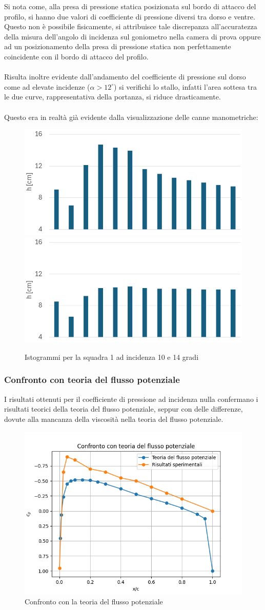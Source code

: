\noindent Si nota come, alla presa di pressione statica posizionata sul bordo di attacco del profilo, si hanno due valori di coefficiente di pressione diversi tra dorso e ventre. Questo non è possibile fisicamente, si attribuisce tale discrepanza all'accuratezza della misura dell'angolo di incidenza sul goniometro nella camera di prova oppure ad un posizionamento della presa di pressione statica non perfettamente coincidente con il bordo di attacco del profilo.\\\\
Risulta inoltre evidente dall'andamento del coefficiente di pressione sul dorso come ad elevate incidenze ($\alpha > 12^\circ$) si verifichi lo stallo, infatti l'area sottesa tra le due curve, rappresentativa della portanza, si riduce drasticamente.\\\\
Questo era in realtà già evidente dalla visualizzazione delle canne manometriche:
\begin{figure}[H]
    \centering
    \includegraphics[width=.49\textwidth]{images/5/dsq1a10.png}
    \includegraphics[width=.49\textwidth]{images/5/dsq1a14.png}
    \caption{Istogrammi per la squadra 1 ad incidenza 10 e 14 gradi}
\end{figure}

\subsubsection{Confronto con teoria del flusso potenziale}
I risultati ottenuti per il coefficiente di pressione ad incidenza nulla confermano i risultati teorici della teoria del flusso potenziale, seppur con delle differenze, dovute alla mancanza della viscosità nella teoria del flusso potenziale.
\begin{figure}[H]
    \centering
    \includegraphics[width=.55\textwidth]{images/5/cpfp.png}
    \caption{Confronto con la teoria del flusso potenziale}
\end{figure}

